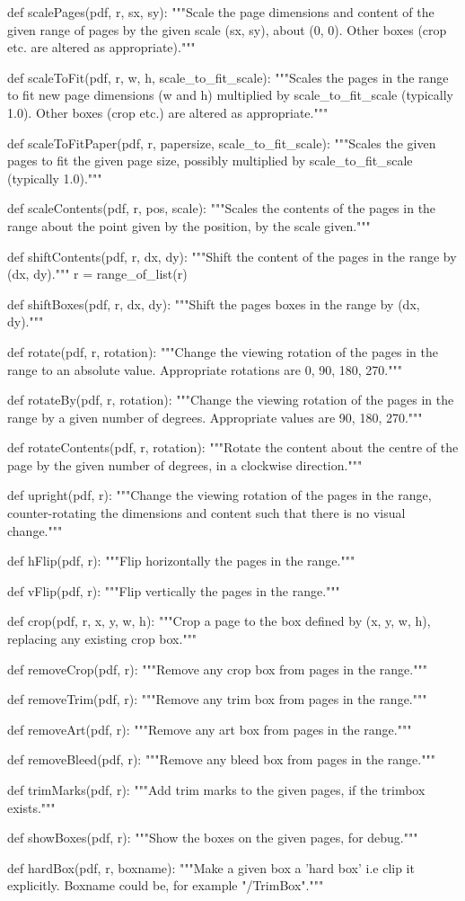 def scalePages(pdf, r, sx, sy):
    """Scale the page dimensions and content of the given range of pages by
    the given scale (sx, sy), about (0, 0). Other boxes (crop etc. are altered
    as appropriate)."""

def scaleToFit(pdf, r, w, h, scale_to_fit_scale):
    """Scales the pages in the range to fit new page dimensions (w and h)
    multiplied by scale_to_fit_scale (typically 1.0).  Other boxes (crop etc.)
    are altered as appropriate."""

def scaleToFitPaper(pdf, r, papersize, scale_to_fit_scale):
    """Scales the given pages to fit the given page size, possibly multiplied
    by scale_to_fit_scale (typically 1.0)."""

def scaleContents(pdf, r, pos, scale):
    """Scales the contents of the pages in the range about the point given by
    the position, by the scale given."""

def shiftContents(pdf, r, dx, dy):
    """Shift the content of the pages in the range by (dx, dy)."""
    r = range_of_list(r)

def shiftBoxes(pdf, r, dx, dy):
    """Shift the pages boxes in the range by (dx, dy)."""

def rotate(pdf, r, rotation):
    """Change the viewing rotation of the pages in the range to an absolute
    value. Appropriate rotations are 0, 90, 180, 270."""

def rotateBy(pdf, r, rotation):
    """Change the viewing rotation of the pages in the range by a given number
    of degrees. Appropriate values are 90, 180, 270."""

def rotateContents(pdf, r, rotation):
    """Rotate the content about the centre of the page by the given number of
    degrees, in a clockwise direction."""

def upright(pdf, r):
    """Change the viewing rotation of the pages in the range, counter-rotating
    the dimensions and content such that there is no visual change."""

def hFlip(pdf, r):
    """Flip horizontally the pages in the range."""

def vFlip(pdf, r):
    """Flip vertically the pages in the range."""

def crop(pdf, r, x, y, w, h):
    """Crop a page to the box defined by (x, y, w, h), replacing any existing
    crop box."""

def removeCrop(pdf, r):
    """Remove any crop box from pages in the range."""

def removeTrim(pdf, r):
    """Remove any trim box from pages in the range."""

def removeArt(pdf, r):
    """Remove any art box from pages in the range."""

def removeBleed(pdf, r):
    """Remove any bleed box from pages in the range."""

def trimMarks(pdf, r):
    """Add trim marks to the given pages, if the trimbox exists."""

def showBoxes(pdf, r):
    """Show the boxes on the given pages, for debug."""

def hardBox(pdf, r, boxname):
    """Make a given box a 'hard box' i.e clip it explicitly. Boxname could be,
    for example "/TrimBox"."""
